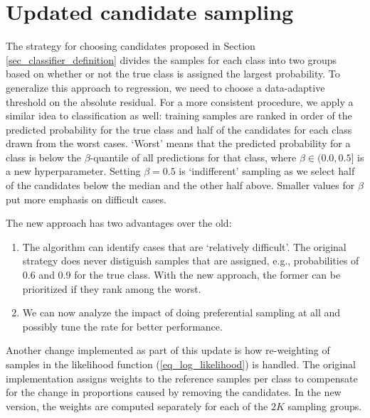 \section{Updated candidate sampling}
\label{sec_updated_candidate_sampling}
%
\begin{center}\end{center}
%
The strategy for choosing candidates proposed in Section \ref{sec_classifier_definition} divides the samples for each class into two groups based on whether or not the true class is assigned the largest probability.
To generalize this approach to regression, we need to choose a data-adaptive threshold on the absolute residual.
For a more consistent procedure, we apply a similar idea to classification as well:
training samples are ranked in order of the predicted probability for the true class and half of the candidates for each class drawn from the worst cases.
`Worst' means that the predicted probability for a class is below the $\beta$-quantile of all predictions for that class, where $\beta\in(0.0,0.5]$ is a new hyperparameter.
Setting $\beta=0.5$ is `indifferent' sampling as we select half of the candidates below the median and the other half above.
Smaller values for $\beta$ put more emphasis on difficult cases.\par
%
The new approach has two advantages over the old:
%
\begin{enumerate}
\item The algorithm can identify cases that are `relatively difficult'.
The original strategy does never distiguish samples that are assigned, e.g., probabilities of 0.6 and 0.9 for the true class.
With the new approach, the former can be prioritized if they rank among the worst.
%
\item We can now analyze the impact of doing preferential sampling at all and possibly tune the rate for better performance.
\end{enumerate}
%
Another change implemented as part of this update is how re-weighting of samples in the likelihood function (\ref{eq_log_likelihood}) is handled.
The original implementation assigns weights to the reference samples per class to compensate for the change in proportions caused by removing the candidates.
In the new version, the weights are computed separately for each of the $2K$ sampling groups.
